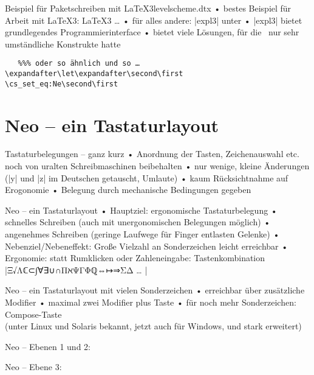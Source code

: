 \documentclass[t]{beamer}
\begin{document}
\begin{frame}[fragile]{Beispiel für Paketschreiben mit \LaTeX3}{levelscheme.dtx}
• bestes Beispiel für Arbeit mit \LaTeX3: \LaTeX3 …
• für alles andere: |expl3| unter \LaTeXe
• |expl3| bietet grundlegendes Programmierinterface
• bietet viele Lösungen, für die \LaTeXe\ nur sehr umständliche Konstrukte hatte
\•
\begin{verbatim}   %%% oder so ähnlich und so …
\expandafter\let\expandafter\second\first
\cs_set_eq:Ne\second\first
\end{verbatim}
\end{frame}

\section{Neo – ein Tastaturlayout}
\begin{frame}{Tastaturbelegungen – ganz kurz}
• Anordnung der Tasten, Zeichenauswahl etc. noch von uralten Schreibmaschinen beibehalten
• nur wenige, kleine Änderungen (|y| und |z| im Deutschen getauscht, Umlaute)
• kaum Rücksichtnahme auf Erogonomie
• Belegung durch mechanische Bedingungen gegeben
\•
\end{frame}

\begin{frame}[fragile]{Neo – ein Tastaturlayout}
• Hauptziel: ergonomische Tastaturbelegung
• schnelles Schreiben (auch mit unergonomischen Belegungen möglich)
• angenehmes Schreiben (geringe Laufwege für Finger entlasten Gelenke)\pause
• Nebenziel/Nebeneffekt: Große Vielzahl an Sonderzeichen leicht erreichbar
• Ergonomie: statt Rumklicken oder Zahleneingabe: Tastenkombination\\%
|Ξ√Λℂ⊂∫∀∃∪∩ΠℵΨΓΦℚ⇔↦⇒ΣΔ … |
\•
\end{frame}

\begin{frame}[fragile]{Neo – ein Tastaturlayout mit vielen Sonderzeichen}
• erreichbar über zusätzliche Modifier
• maximal zwei Modifier plus Taste
• für noch mehr Sonderzeichen: Compose-Taste\\%
(unter Linux und Solaris bekannt, jetzt auch für Windows, und stark erweitert)
\•
\end{frame}

\begin{frame}{Neo – Ebenen 1 und 2:}

\end{frame}

\begin{frame}{Neo – Ebene 3:}

\end{frame} 
\end{document}
